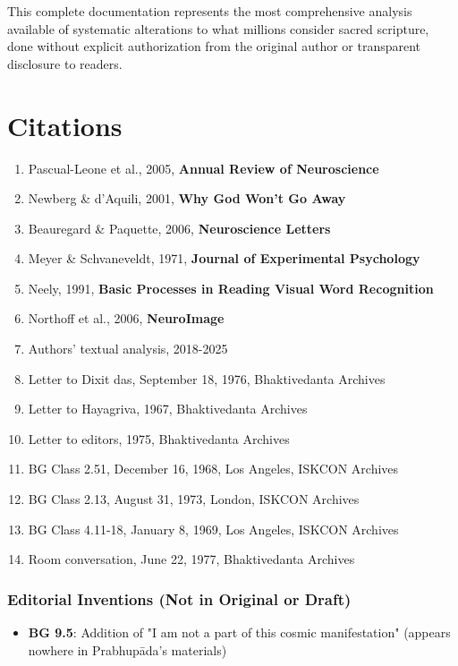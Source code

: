\documentclass[11pt,twoside]{book}
\begin{document}
This complete documentation represents the most comprehensive analysis available of systematic alterations to what millions consider sacred scripture, done without explicit authorization from the original author or transparent disclosure to readers.
\part*{Citations}
\label{sec:org9084f5a}
\thispagestyle{chapterpage}

\begin{enumerate}
\item Pascual-Leone et al., 2005, \textbf{Annual Review of Neuroscience}
\item Newberg \& d'Aquili, 2001, \textbf{Why God Won't Go Away}
\item Beauregard \& Paquette, 2006, \textbf{Neuroscience Letters}
\item Meyer \& Schvaneveldt, 1971, \textbf{Journal of Experimental Psychology}
\item Neely, 1991, \textbf{Basic Processes in Reading Visual Word Recognition}
\item Northoff et al., 2006, \textbf{NeuroImage}
\item Authors' textual analysis, 2018-2025
\item Letter to Dixit das, September 18, 1976, Bhaktivedanta Archives
\item Letter to Hayagriva, 1967, Bhaktivedanta Archives
\item Letter to editors, 1975, Bhaktivedanta Archives
\item BG Class 2.51, December 16, 1968, Los Angeles, ISKCON Archives
\item BG Class 2.13, August 31, 1973, London, ISKCON Archives
\item BG Class 4.11-18, January 8, 1969, Los Angeles, ISKCON Archives
\item Room conversation, June 22, 1977, Bhaktivedanta Archives
\end{enumerate}
\section*{Editorial Inventions (Not in Original or Draft)}
\label{sec:orgf732d85}
\begin{itemize}
\item \textbf{\textbf{BG 9.5}}: Addition of "I am not a part of this cosmic manifestation" (appears nowhere in Prabhupāda's materials)
\end{itemize}
\end{document}

